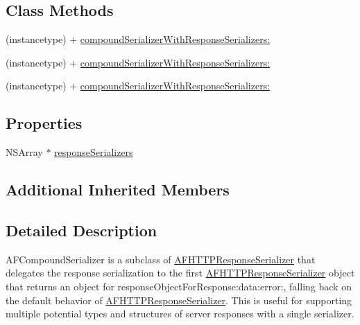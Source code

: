 \subsection*{Class Methods}
\begin{DoxyCompactItemize}
\item 
(instancetype) + \mbox{\hyperlink{interface_a_f_compound_response_serializer_a48bf2d3d5a18d9cc73b6e29ef30c6e56}{compound\+Serializer\+With\+Response\+Serializers\+:}}
\item 
(instancetype) + \mbox{\hyperlink{interface_a_f_compound_response_serializer_a48bf2d3d5a18d9cc73b6e29ef30c6e56}{compound\+Serializer\+With\+Response\+Serializers\+:}}
\item 
(instancetype) + \mbox{\hyperlink{interface_a_f_compound_response_serializer_a48bf2d3d5a18d9cc73b6e29ef30c6e56}{compound\+Serializer\+With\+Response\+Serializers\+:}}
\end{DoxyCompactItemize}
\subsection*{Properties}
\begin{DoxyCompactItemize}
\item 
N\+S\+Array $\ast$ \mbox{\hyperlink{interface_a_f_compound_response_serializer_aefd03c34697b76eeafca950a999f92b5}{response\+Serializers}}
\end{DoxyCompactItemize}
\subsection*{Additional Inherited Members}


\subsection{Detailed Description}
{\ttfamily A\+F\+Compound\+Serializer} is a subclass of {\ttfamily \mbox{\hyperlink{interface_a_f_h_t_t_p_response_serializer}{A\+F\+H\+T\+T\+P\+Response\+Serializer}}} that delegates the response serialization to the first {\ttfamily \mbox{\hyperlink{interface_a_f_h_t_t_p_response_serializer}{A\+F\+H\+T\+T\+P\+Response\+Serializer}}} object that returns an object for {\ttfamily response\+Object\+For\+Response\+:data\+:error\+:}, falling back on the default behavior of {\ttfamily \mbox{\hyperlink{interface_a_f_h_t_t_p_response_serializer}{A\+F\+H\+T\+T\+P\+Response\+Serializer}}}. This is useful for supporting multiple potential types and structures of server responses with a single serializer. 

